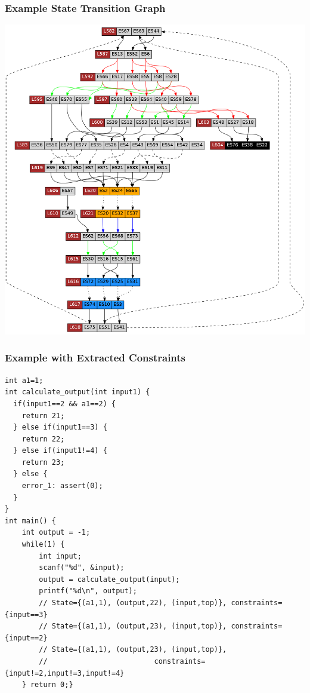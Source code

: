 \begin{frame}[fragile]
\frametitle{Example State Transition Graph}

\begin{center}
\includegraphics[height=0.65\columnwidth]{example1gfx1/transitiongraph2}
\end{center}


\end{frame}

\begin{frame}[fragile]
\frametitle{Example with Extracted Constraints}
\vspace{-0.3cm}
{\scriptsize
\begin{verbatim}
int a1=1;
int calculate_output(int input1) {
  if(input1==2 && a1==2) {
    return 21;
  } else if(input1==3) {
    return 22;
  } else if(input1!=4) {
    return 23;
  } else {
    error_1: assert(0);
  }
}
int main() {
    int output = -1;
    while(1) {
        int input;
        scanf("%d", &input);        
        output = calculate_output(input);
        printf("%d\n", output);
        // State={(a1,1), (output,22), (input,top)}, constraints={input==3}
        // State={(a1,1), (output,23), (input,top)}, constraints={input==2}
        // State={(a1,1), (output,23), (input,top)}, 
        //                         constraints={input!=2,input!=3,input!=4}
    } return 0;}
\end{verbatim}
}
\end{frame}

